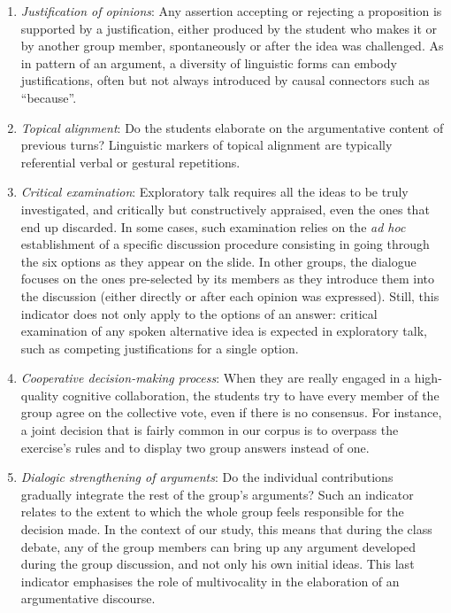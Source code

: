 \documentclass[output=paper]{langscibook}
\begin{document}
\begin{enumerate}
\item \textit{Justification of opinions}: Any assertion accepting or rejecting a proposition is supported by a justification, either produced by the student who makes it or by another group member, spontaneously or after the idea was challenged. As in  pattern of an argument, a diversity of linguistic forms can embody justifications, often but not always introduced by causal connectors such as “because”.

\item \textit{Topical alignment}: Do the students elaborate on the argumentative content of previous turns? Linguistic markers of topical alignment are typically referential verbal or gestural repetitions.

\item \textit{Critical examination}: Exploratory talk requires all the ideas to be truly investigated, and critically but constructively appraised, even the ones that end up discarded. In some cases, such examination relies on the \textit{ad hoc} establishment of a specific discussion procedure consisting in going through the six options as they appear on the slide. In other groups, the dialogue focuses on the ones pre-selected by its members as they introduce them into the discussion (either directly or after each opinion was expressed). Still, this indicator does not only apply to the options of an answer: critical examination of any spoken alternative idea is expected in exploratory talk, such as competing justifications for a single option.

\item \textit{Cooperative decision-making process}: When they are really engaged in a high-quality cognitive collaboration, the students try to have every member of the group agree on the collective vote, even if there is no consensus. For instance, a joint decision that is fairly common in our corpus is to overpass the exercise’s rules and to display two group answers instead of one.

\item \textit{Dialogic strengthening of arguments}: Do the individual contributions gradually integrate the rest of the group’s arguments? Such an indicator relates to the extent to which the whole group feels responsible for the decision made. In the context of our study, this means that during the class debate, any of the group members can bring up any argument developed during the group discussion, and not only his own initial ideas. This last indicator emphasises the role of multivocality in the elaboration of an argumentative discourse.
\end{enumerate}
\end{document}
